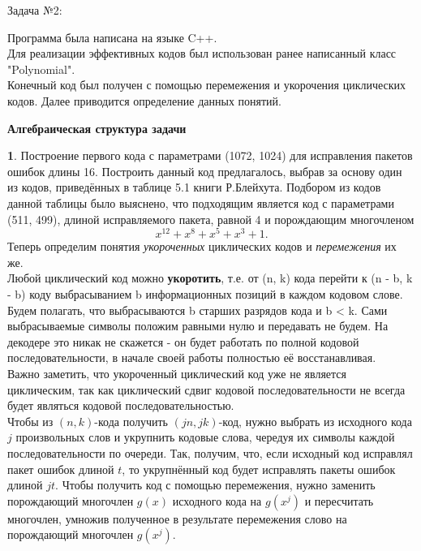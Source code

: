 \documentclass{article}
\begin{document}
   	\newpage
   		\begin{center}
   			\textbf \large {Задача №2:}
   		\end{center} 
   		
   		Программа была написана на языке C++.\\
   		Для реализации эффективных кодов был использован ранее написанный класс "Polynomial".
   		\\
   		Конечный код был получен с помощью перемежения и укорочения циклических кодов. Далее приводится определение данных понятий.
   		
   		\begin{center}
   			\large \textbf {Алгебраическая структура задачи}
   		\end{center}	 
   		\textbf{1}. Построение первого кода с параметрами (1072, 1024) для исправления пакетов ошибок длины 16.
   		Построить данный код предлагалось, выбрав за основу один из кодов, приведённых в таблице 5.1 книги Р.Блейхута. Подбором из кодов данной таблицы было выяснено, что подходящим является код с параметрами (511, 499), длиной исправляемого пакета, равной 4 и порождающим многочленом $$x^{12} + x^{8} + x^5 + x^3 + 1.$$
   		Теперь определим понятия \textit{укороченных} циклических кодов и \textit{перемежения} их же.\\
   		
   		Любой циклический код можно \textbf{укоротить}, т.е. от (n, k) кода перейти к (n - b, k - b) коду выбрасыванием b информационных позиций в каждом кодовом слове. Будем полагать, что выбрасываются b старших разрядов кода и b < k.
   		Сами выбрасываемые символы положим равными нулю и передавать не будем. На декодере это никак не скажется - он будет работать по полной кодовой последовательности, в начале своей работы полностью её восстанавливая.\\
   		
   		Важно заметить, что укороченный циклический код уже не является циклическим, так как циклический сдвиг кодовой последовательности не всегда будет являться кодовой последовательностью. \\
   		
   		Чтобы из $(n, k)$-кода получить $(jn, jk)$-код, нужно выбрать из исходного кода $j$ произвольных слов и укрупнить кодовые слова, чередуя их символы каждой последовательности по очереди. Так, получим, что, если исходный код исправлял пакет ошибок длиной $t$, то укрупнённый код будет исправлять пакеты ошибок длиной $jt$.
   		Чтобы получить код с помощью перемежения, нужно заменить порождающий многочлен $g(x)$ исходного кода на $g(x^j)$ и пересчитать многочлен, умножив полученное в результате перемежения слово на порождающий многочлен $g(x^j)$.\\
   		
\end{document}
